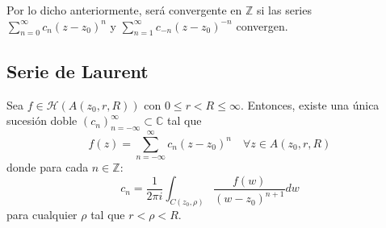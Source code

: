 Por lo dicho anteriormente, será convergente en $\mathbb{Z}$ si las series $\sum_{n=0}^{\infty} c_n (z - z_0)^n$ y $\sum_{n=1}^{\infty} c_{-n} (z - z_0)^{-n}$ convergen.

\subsection{Serie de Laurent}

\begin{teorema} 
    Sea $f \in \mathcal{H}(A(z_0, r, R))$ con $0 \leq r < R \leq \infty$. Entonces, existe una única sucesión doble $(c_n)_{n=-\infty}^{\infty} \subset \mathbb{C}$ tal que 
    \[
        f(z) = \sum_{n=-\infty}^{\infty} c_n (z - z_0)^n \quad \forall z \in A(z_0, r, R)
    \]
    donde para cada $n \in \mathbb{Z}$:
    \[
        c_n = \frac{1}{2 \pi i} \int_{C(z_0, \rho)} \frac{f(w)}{(w - z_0)^{n+1}} dw
    \]
    para cualquier $\rho$ tal que $r < \rho < R$.
\end{teorema}

